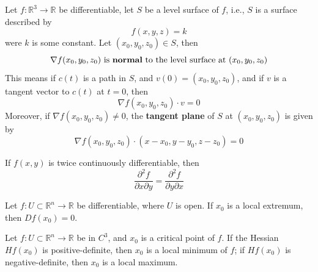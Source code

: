 \documentclass[openany]{book}
\newcommand{\R}{\mathbb{R}}
\begin{document}
\begin{prop}\label{tangent plane}
    Let $f:\R^3\to\R$ be differentiable, let $S$ be a level surface of $f$, i.e., $S$ is a surface described by 
    \begin{equation*}
        f(x,y,z)=k
    \end{equation*}
    were $k$ is some constant. Let $(x_0,y_0,z_0)\in S$, then
    \begin{equation*}
        \nabla f(x_0,y_0,z_0) \text{ is \textbf{normal} to the level surface at } (x_0,y_0,z_0)
    \end{equation*}
    This means if $c(t)$ is a path in $S$, and $v(0)=(x_0,y_0,z_0)$, and if $v$ is a tangent vector to $c(t)$ at $t=0$, then 
    \begin{equation*}
        \nabla f(x_0,y_0, z_0)\cdot v=0
    \end{equation*}
    Moreover, if $\nabla f(x_0,y_0,z_0)\neq 0$, the \textbf{tangent plane} of $S$ at $(x_0,y_0,z_0)$ is given by 
    \begin{equation*}
        \nabla f(x_0,y_0,z_0)\cdot (x-x_0, y-y_0, z-z_0)=0
    \end{equation*}
\end{prop}

\begin{prop}
    If $f(x,y)$ is twice continuously differentiable, then 
    \begin{equation*}
        \frac{\partial^2 f}{\partial x\partial y}=\frac{\partial^2f}{\partial y\partial x}
    \end{equation*}
\end{prop}


\begin{prop}
    Let $f:U\subset\R^n\to\R$ be differentiable, where $U$ is open. If $x_0$ is a local extremum, then $Df(x_0)=0$. 
\end{prop}


\begin{prop}[extremum]
    Let $f\colon U\subset\R^n\to\R$ be in $C^3$, and $x_0$ is a critical point of $f$. If the Hessian $Hf(x_0)$ is positive-definite, then $x_0$ is a local minimum of $f$; if $Hf(x_0)$ is negative-definite, then $x_0$ is a local maximum.
\end{prop}
\end{document}
